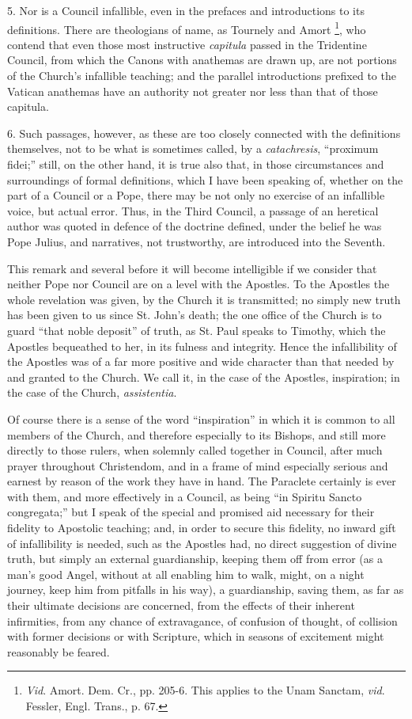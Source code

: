 5. Nor is a Council infallible, even in the prefaces and
introductions to its definitions. There are theologians of name, as
Tournely and Amort \footnote{\emph{Vid}. Amort. Dem. Cr., pp. 205-6. This applies to the Unam
Sanctam, \emph{vid}. Fessler, Engl. Trans., p. 67.}, who contend that even those most
instructive \emph{capitula} passed in the Tridentine Council, from which
the Canons with anathemas are drawn up, are not portions of the Church's
infallible teaching; and the parallel introductions prefixed to the
Vatican anathemas have an authority not greater nor less than that of
those capitula.

6. Such passages, however, as these are too closely connected with
the definitions themselves, not to be what is sometimes called, by a \emph{catachresis},
``proximum fidei;'' still, on the other hand, it is true also
that, in those circumstances and surroundings of formal definitions,
which I have been speaking of, whether on the part of a Council or a
Pope, there may be not only no exercise of an infallible voice, but
actual error. Thus, in the Third Council, a passage of an heretical
author was quoted in defence of the doctrine defined, under the belief
he was Pope Julius, and narratives, not trustworthy, are introduced into
the Seventh.

This remark and several before it will become intelligible if we
consider that neither Pope nor Council are on a level with the Apostles.
To the Apostles the whole revelation was given, by the Church it is
transmitted; no simply new truth has been given to us since St. John's
death; the one office of the Church is to guard ``that noble
deposit'' of truth, as St. Paul speaks to Timothy, which the
Apostles bequeathed to her, in its fulness and integrity. Hence the
infallibility of the Apostles was of a far more positive and wide
character than that needed by and granted to the Church. We call it, in
the case of the Apostles, inspiration; in the case of the Church, \emph{assistentia}.

Of course there is a sense of the word ``inspiration'' in
which it is common to all members of the Church, and therefore
especially to its Bishops, and still more directly to those rulers, when
solemnly called together in Council, after much prayer throughout
Christendom, and in a frame of mind especially serious and earnest by
reason of the work they have in hand. The Paraclete certainly is
ever with them, and more effectively in a Council, as being ``in
Spiritu Sancto congregata;'' but I speak of the special and promised
aid necessary for their fidelity to Apostolic teaching; and, in order to
secure this fidelity, no inward gift of infallibility is needed, such as
the Apostles had, no direct suggestion of divine truth, but simply an
external guardianship, keeping them off from error (as a man's good
Angel, without at all enabling him to walk, might, on a night journey,
keep him from pitfalls in his way), a guardianship, saving them, as far
as their ultimate decisions are concerned, from the effects of their
inherent infirmities, from any chance of extravagance, of confusion of
thought, of collision with former decisions or with Scripture, which in
seasons of excitement might reasonably be feared.

